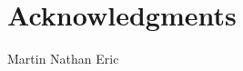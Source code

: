 \documentclass{sig-alternate}
\begin{document}

\section{Acknowledgments}
Martin
Nathan
Eric


%
%

\balancecolumns
\end{document}
